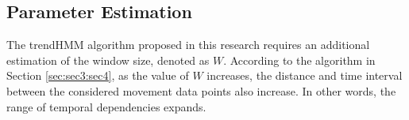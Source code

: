 \documentclass[preprint,12pt]{elsarticle}
\begin{document}
\subsection{Parameter Estimation}
\label{sec:sec4:sec2}
The trendHMM algorithm proposed in this research requires an additional estimation of the window size, denoted as $W$. According to the algorithm in Section \ref{sec:sec3:sec4}, as the value of $W$ increases, the distance and time interval between the considered movement data points also increase. In other words, the range of temporal dependencies expands.
\begin{figure}
	\centering
	\quad
\end{figure}
\end{document}
